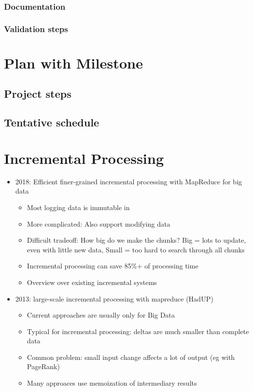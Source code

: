 \documentclass{seal_article}
\begin{document}
\subsubsection{Documentation}
\subsubsection{Validation steps}

\section{Plan with Milestone}
\subsection{Project steps}
\subsection{Tentative schedule}

\section{Incremental Processing}
\begin{itemize}
\item 2018: Efficient finer-grained incremental processing with MapReduce for big data
\begin{itemize}
\item Most logging data is immutable in
\item More complicated: Also support modifying data
\item Difficult tradeoff: How big do we make the chunks? Big = lots to update, even with little new data, Small = too hard to search through all chunks
\item Incremental processing can save 85\%+ of processing time
\item Overview over existing incremental systems
\end{itemize}
\item 2013: large-scale incremental processing with mapreduce (HadUP)
\begin{itemize}
\item Current approaches are usually only for Big Data
\item Typical for incremental processing: deltas are much smaller than complete data
\item Common problem: small input change affects a lot of output (eg with PageRank)
\item Many approaces use memoization of intermediary results
\end{itemize}
\end{itemize}




\end{document}
